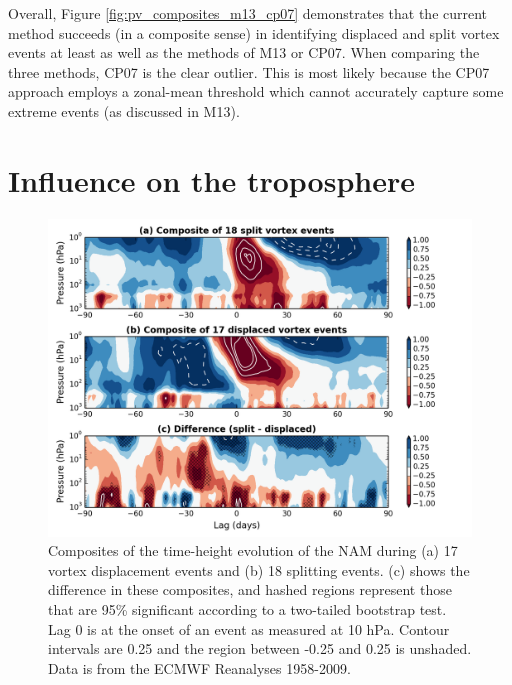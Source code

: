 Overall, Figure \ref{fig:pv_composites_m13_cp07} demonstrates that the current
method succeeds (in a composite sense) in identifying displaced and split vortex
events at least as well as the methods of M13 or CP07. When comparing the three
methods, CP07 is the clear outlier. This is most likely because the CP07
approach employs a zonal-mean threshold which cannot accurately capture some
extreme events (as discussed in M13).


\section{Influence on the troposphere}
\label{sec:moments_analysis}

\begin{figure}
 \centering
 \noindent\includegraphics[width=\textwidth]{figures/chapter-moments/dripping_paint.png}
 \caption[NAM composites for split and displaced vortex events.]{Composites of
   the time-height evolution of the NAM during (a) 17 vortex displacement events
   and (b) 18 splitting events. (c) shows the difference in these composites,
   and hashed regions represent those that are 95\% significant according to a
   two-tailed bootstrap test. Lag 0 is at the onset of an event as measured at
   10 hPa. Contour intervals are 0.25 and the region between -0.25 and 0.25 is
   unshaded. Data is from the ECMWF Reanalyses 1958-2009.}
 \label{fig:dripping_paint}
\end{figure}


